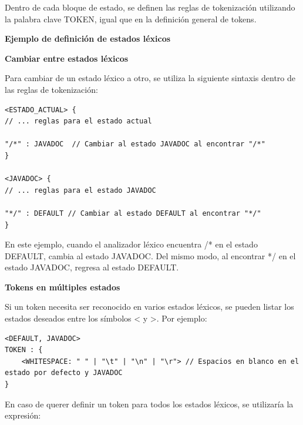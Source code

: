 \lstset{inputencoding=utf8/latin1}


Dentro de cada bloque de estado, se definen las reglas de tokenización utilizando la palabra clave TOKEN, igual que en la definición general de tokens.

\phantom{text}

\noindent \textbf{Ejemplo de definición de estados léxicos}

\phantom{text}

\lstset{inputencoding=utf8/latin1}



\phantom{text}

\noindent \textbf{Cambiar entre estados léxicos}

\phantom{text}

Para cambiar de un estado léxico a otro, se utiliza la siguiente sintaxis dentro de las reglas de tokenización:

\lstset{inputencoding=utf8/latin1}
\begin{lstlisting}
<ESTADO_ACTUAL> {
// ... reglas para el estado actual

"/*" : JAVADOC  // Cambiar al estado JAVADOC al encontrar "/*" 
} 

<JAVADOC> {
// ... reglas para el estado JAVADOC 

"*/" : DEFAULT // Cambiar al estado DEFAULT al encontrar "*/"
}
\end{lstlisting}

En este ejemplo, cuando el analizador léxico encuentra /* en el estado DEFAULT, cambia al estado JAVADOC. Del mismo modo, al encontrar */ en el estado JAVADOC, regresa al estado DEFAULT.

\phantom{text}

\noindent \textbf{Tokens en múltiples estados}

\phantom{text}

Si un token necesita ser reconocido en varios estados léxicos, se pueden listar los estados deseados entre los símbolos < y >. Por ejemplo:

\lstset{inputencoding=utf8/latin1}
\begin{lstlisting}
<DEFAULT, JAVADOC>
TOKEN : {
	<WHITESPACE: " " | "\t" | "\n" | "\r"> // Espacios en blanco en el estado por defecto y JAVADOC
}
\end{lstlisting}

En caso de querer definir un token para todos los estados léxicos, se utilizaría la expresión:

